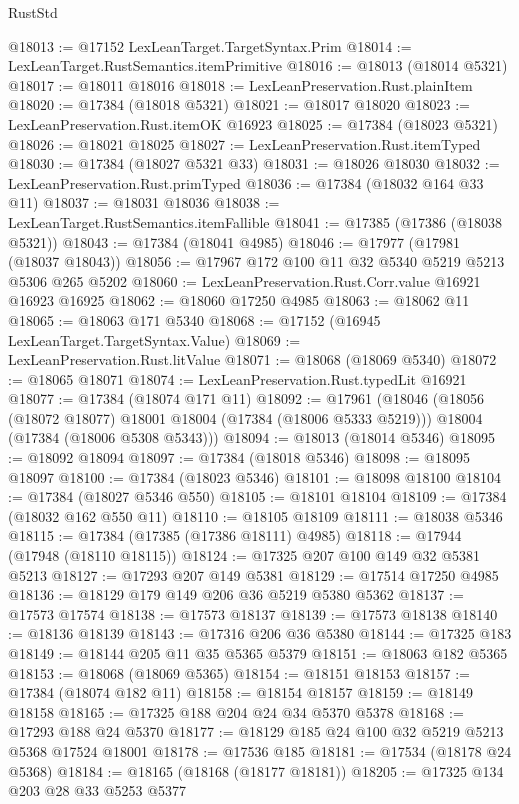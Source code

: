 \begin{lexlean}{RustStd}
\begin{coremodule}
@18013 := @17152 LexLeanTarget.TargetSyntax.Prim
@18014 := LexLeanTarget.RustSemantics.itemPrimitive
@18016 := @18013 (@18014 @5321)
@18017 := @18011 @18016
@18018 := LexLeanPreservation.Rust.plainItem
@18020 := @17384 (@18018 @5321)
@18021 := @18017 @18020
@18023 := LexLeanPreservation.Rust.itemOK @16923
@18025 := @17384 (@18023 @5321)
@18026 := @18021 @18025
@18027 := LexLeanPreservation.Rust.itemTyped
@18030 := @17384 (@18027 @5321 @33)
@18031 := @18026 @18030
@18032 := LexLeanPreservation.Rust.primTyped
@18036 := @17384 (@18032 @164 @33 @11)
@18037 := @18031 @18036
@18038 := LexLeanTarget.RustSemantics.itemFallible
@18041 := @17385 (@17386 (@18038 @5321))
@18043 := @17384 (@18041 @4985)
@18046 := @17977 (@17981 (@18037 @18043))
@18056 := @17967 @172 @100 @11 @32 @5340 @5219 @5213 @5306 @265 @5202
@18060 := LexLeanPreservation.Rust.Corr.value @16921 @16923 @16925
@18062 := @18060 @17250 @4985
@18063 := @18062 @11
@18065 := @18063 @171 @5340
@18068 := @17152 (@16945 LexLeanTarget.TargetSyntax.Value)
@18069 := LexLeanPreservation.Rust.litValue
@18071 := @18068 (@18069 @5340)
@18072 := @18065 @18071
@18074 := LexLeanPreservation.Rust.typedLit @16921
@18077 := @17384 (@18074 @171 @11)
@18092 := @17961
    (@18046
      (@18056 (@18072 @18077) @18001 @18004 (@17384 (@18006 @5333 @5219)))
      @18004
      (@17384 (@18006 @5308 @5343)))
@18094 := @18013 (@18014 @5346)
@18095 := @18092 @18094
@18097 := @17384 (@18018 @5346)
@18098 := @18095 @18097
@18100 := @17384 (@18023 @5346)
@18101 := @18098 @18100
@18104 := @17384 (@18027 @5346 @550)
@18105 := @18101 @18104
@18109 := @17384 (@18032 @162 @550 @11)
@18110 := @18105 @18109
@18111 := @18038 @5346
@18115 := @17384 (@17385 (@17386 @18111) @4985)
@18118 := @17944 (@17948 (@18110 @18115))
@18124 := @17325 @207 @100 @149 @32 @5381 @5213
@18127 := @17293 @207 @149 @5381
@18129 := @17514 @17250 @4985
@18136 := @18129 @179 @149 @206 @36 @5219 @5380 @5362
@18137 := @17573 @17574
@18138 := @17573 @18137
@18139 := @17573 @18138
@18140 := @18136 @18139
@18143 := @17316 @206 @36 @5380
@18144 := @17325 @183
@18149 := @18144 @205 @11 @35 @5365 @5379
@18151 := @18063 @182 @5365
@18153 := @18068 (@18069 @5365)
@18154 := @18151 @18153
@18157 := @17384 (@18074 @182 @11)
@18158 := @18154 @18157
@18159 := @18149 @18158
@18165 := @17325 @188 @204 @24 @34 @5370 @5378
@18168 := @17293 @188 @24 @5370
@18177 := @18129 @185 @24 @100 @32 @5219 @5213 @5368 @17524 @18001
@18178 := @17536 @185
@18181 := @17534 (@18178 @24 @5368)
@18184 := @18165 (@18168 (@18177 @18181))
@18205 := @17325
    @134
    @203
    @28
    @33
    @5253
    @5377

\end{coremodule}
\end{lexlean}
